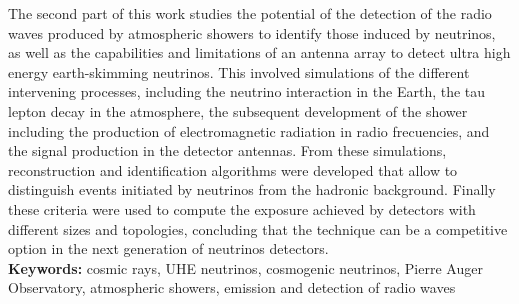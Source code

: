 \begin{titlepage}
The second part of this work studies the potential of the detection of the radio waves produced by atmospheric showers to identify those induced by neutrinos, as well as the capabilities and limitations of an antenna array to detect ultra high energy earth-skimming neutrinos.
This involved simulations of the different intervening processes, including the neutrino interaction in the Earth, the tau lepton decay in the atmosphere, the subsequent development of the shower including the production of electromagnetic radiation in radio frecuencies, and the signal production in the detector antennas.
From these simulations, reconstruction and identification algorithms were developed that allow to distinguish events initiated by neutrinos from the hadronic background.
Finally these criteria were used to compute the exposure achieved by detectors with different sizes and topologies, concluding that the technique can be a competitive option in the next generation of neutrinos detectors.\\[0.2cm]

\noindent
\textbf{Keywords: } cosmic rays, UHE neutrinos, cosmogenic neutrinos, Pierre Auger Observatory, atmospheric showers, emission and detection of radio waves\\

\end{titlepage}












